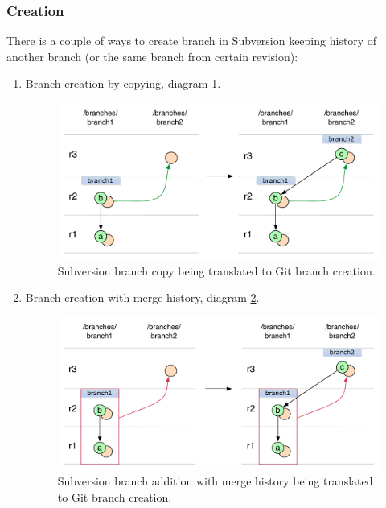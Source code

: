 \subsubsection{Creation}

There is a couple of ways to create branch in Subversion keeping history of another branch (or the same branch from certain revision):

\begin{enumerate}
\compactlist
\renewcommand{\figurename}{Diagram}
\item Branch creation by copying, diagram \ref{branch_creation_svn_to_git}.
\begin{figure}[!h]
\centering
\includegraphics[width=\linewidth]{img/diagrams/branch_creation_svn_to_git.pdf}
\caption{Subversion branch copy being translated to Git branch creation.}
\label{branch_creation_svn_to_git}
\end{figure}

\item Branch creation with merge history, diagram \ref{branch_creation_from_mergeinfo_svn_to_git}.
\begin{figure}[!h]
\centering
\renewcommand{\figurename}{Diagram}
\includegraphics[width=\linewidth]{img/diagrams/branch_creation_from_mergeinfo_svn_to_git.pdf}
\caption{Subversion branch addition with merge history being translated to Git branch creation.}
\label{branch_creation_from_mergeinfo_svn_to_git}
\end{figure}
\end{enumerate}

